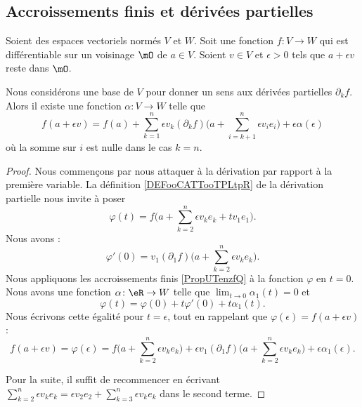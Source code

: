 \subsection{Accroissements finis et dérivées partielles}

\begin{lemma}       \label{LEMooNMTAooLgMkgH}
    Soient des espaces vectoriels normés \( V\) et \( W\). Soit une fonction \( f\colon V\to W\) qui est différentiable sur un voisinage \( \mO\) de \( a\in V\). Soient \( v\in V\) et \( \epsilon>0\) tels que \(a+\epsilon v\) reste dans \( \mO\).

    Nous considérons une base de \( V\) pour donner un sens aux dérivées partielles \( \partial_kf\). Alors il existe une fonction \( \alpha\colon V\to W\) telle que
    \begin{equation}
        f(a+\epsilon v)=f(a)+\sum_{k=1}^n\epsilon v_k (\partial_kf)\big( a+\sum_{i=k+1}^n\epsilon v_ie_i \big)+\epsilon\alpha(\epsilon)
    \end{equation}
    où la somme sur \( i\) est nulle dans le cas \( k=n\).
\end{lemma}

\begin{proof}
    Nous commençons par nous attaquer à la dérivation par rapport à la première variable. La définition \ref{DEFooCATTooTPLtpR} de la dérivation partielle nous invite à poser
    \begin{equation}
        \varphi(t)=f\big( a+\sum_{k=2}^n\epsilon v_ke_k+tv_1e_1 \big).
    \end{equation}
    Nous avons :
    \begin{equation}
        \varphi'(0)=v_1(\partial_1f)\big( a+\sum_{k=2}^n\epsilon v_ke_k \big).
    \end{equation}
    Nous appliquons les accroissements finis \ref{PropUTenzfQ} à la fonction \( \varphi\) en \( t=0\). Nous avons une fonction \( \alpha\colon \eR\to W\) telle que \( \lim_{t\to 0} \alpha_1(t)=0\) et
    \begin{equation}
        \varphi(t)=\varphi(0)+t\varphi'(0)+t\alpha_1(t).
    \end{equation}
    Nous écrivons cette égalité pour \( t=\epsilon\), tout en rappelant que \( \varphi(\epsilon)=f(a+\epsilon v)\) :
    \begin{equation}
        f(a+\epsilon v) =  \varphi(\epsilon)=f\big( a+\sum_{k=2}^n\epsilon v_ke_k \big)+\epsilon v_1(\partial_1f)\big( a+\sum_{k=2}^n \epsilon v_ke_k \big)+\epsilon \alpha_1(\epsilon).
    \end{equation}
    
    Pour la suite, il suffit de recommencer en écrivant \( \sum_{k=2}^n \epsilon v_ke_k=\epsilon v_2 e_2+\sum_{k=3}^n\epsilon v_k e_k\) dans le second terme.
\end{proof}

